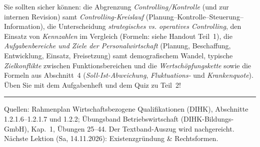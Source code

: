\documentclass[11pt, a4paper]{article}
\begin{document}
\begin{merksatz}[title={\bfseries Wichtig für die Prüfungsvorbereitung (Teil 2)}]
Sie sollten sicher können: die Abgrenzung \emph{Controlling/Kontrolle} (und zur internen
Revision) samt \emph{Controlling-Kreislauf} (Planung--Kontrolle--Steuerung--Information),
die Unterscheidung \emph{strategisches vs. operatives Controlling}, den Einsatz von
\emph{Kennzahlen} im Vergleich (Formeln: siehe Handout Teil~1), die
\emph{Aufgabenbereiche und Ziele der Personalwirtschaft} (Planung, Beschaffung,
Entwicklung, Einsatz, Freisetzung) samt demografischem Wandel, typische
\emph{Zielkonflikte} zwischen Funktionsbereichen und die \emph{Wertschöpfungskette}
sowie die Formeln aus Abschnitt~4 (\emph{Soll-Ist-Abweichung}, \emph{Fluktuations-} und
\emph{Krankenquote}).
Üben Sie mit dem Aufgabenheft und dem Quiz zu Teil~2!
\end{merksatz}

\vspace{1em}
\hrule
\vspace{0.8em}
\noindent\textsf{\small Quellen: Rahmenplan Wirtschaftsbezogene Qualifikationen (DIHK),
Abschnitte 1.2.1.6--1.2.1.7 und 1.2.2; Übungsband Betriebswirtschaft (DIHK-Bildungs-GmbH),
Kap.~1, Übungen 25--44. Der Textband-Auszug wird nachgereicht. Nächste Lektion
(Sa, 14.11.2026): Existenzgründung \& Rechtsformen.}
\end{document}

